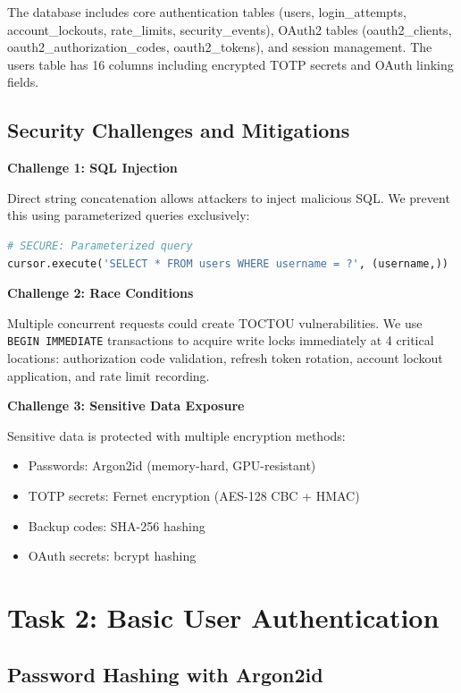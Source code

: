 \documentclass[12pt,a4paper]{article}
\begin{document}
The database includes core authentication tables (users, login\_attempts, account\_lockouts, rate\_limits, security\_events), OAuth2 tables (oauth2\_clients, oauth2\_authorization\_codes, oauth2\_tokens), and session management. The users table has 16 columns including encrypted TOTP secrets and OAuth linking fields.

\subsection{Security Challenges and Mitigations}

\textbf{Challenge 1: SQL Injection}

Direct string concatenation allows attackers to inject malicious SQL. We prevent this using parameterized queries exclusively:

\begin{lstlisting}[language=Python]
# SECURE: Parameterized query
cursor.execute('SELECT * FROM users WHERE username = ?', (username,))
\end{lstlisting}

\textbf{Challenge 2: Race Conditions}

Multiple concurrent requests could create TOCTOU vulnerabilities. We use \texttt{BEGIN IMMEDIATE} transactions to acquire write locks immediately at 4 critical locations: authorization code validation, refresh token rotation, account lockout application, and rate limit recording.

\textbf{Challenge 3: Sensitive Data Exposure}

Sensitive data is protected with multiple encryption methods:
\begin{itemize}
    \item Passwords: Argon2id (memory-hard, GPU-resistant)
    \item TOTP secrets: Fernet encryption (AES-128 CBC + HMAC)
    \item Backup codes: SHA-256 hashing
    \item OAuth secrets: bcrypt hashing
\end{itemize}

\section{Task 2: Basic User Authentication}

\subsection{Password Hashing with Argon2id}
\end{document}
